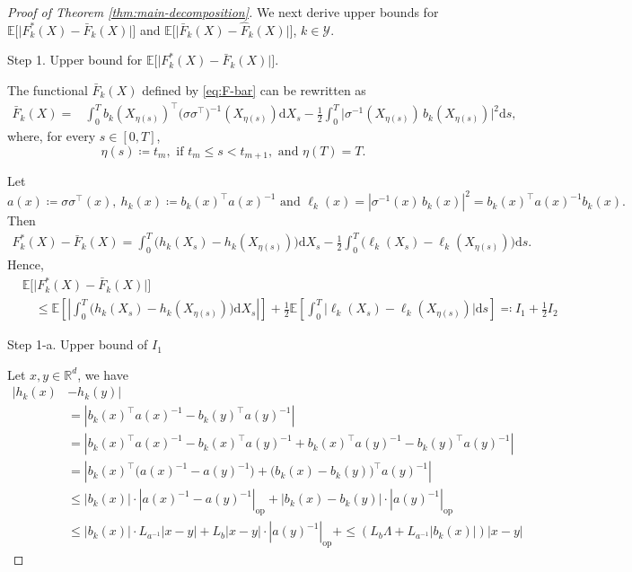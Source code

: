 \documentclass{article}
\theoremstyle{plain}
\theoremstyle{definition}
\theoremstyle{remark}
\renewcommand{\d}{\mathrm{d}}
\newcommand{\RD}{\mathbb{R}^{d}}
\newcommand{\EE}{\mathbb{E}}
\newcommand{\calY}{\mathcal{Y}}
\begin{document}
\begin{proof}[Proof of Theorem \ref{thm:main-decomposition}]
We next derive upper bounds for
$\EE \big[ \big|F_k^*(X)-\bar F_k(X) \big|\big]$ and $\EE \big[ \big|\bar F_k(X)-\widehat F_k(X) \big|\big]$, $k\in\calY$. 

{\sc Step 1. Upper bound for $\EE \big[ \big|F_k^*(X)-\bar F_k(X) \big|\big]$.}


The functional $\bar F_k(X)$ defined by \eqref{eq:F-bar} can be rewritten as 
\begin{align}\label{eq:F-bar-rewrite}
\bar{F}_k(X)
=& \int_{0}^{T}b_k(X_{\eta(s)})^{\top} \big(\sigma\sigma^{\top}\big)^{-1}(X_{\eta(s)})\d X_s - \frac{1}{2}\int_{0}^{T} \big\lvert \sigma^{-1} (X_{\eta(s)})\,b_k(X_{\eta(s)}) \big\rvert^2 \d s,
\end{align}
where, for every $s\in[0, T]$, 
\begin{equation}\label{eq:def-eta(s)}
    \eta (s)\coloneqq t_m, \text{ if } t_m\leq s < t_{m+1}, \text{ and }\eta(T)=T.
\end{equation}%

Let \[a(x)\coloneqq\sigma\sigma^{\top}(x), \:h_k(x)\coloneqq b_k(x)^{\top} a(x)^{-1}\text{ and }\ell_k(x)=|\sigma^{-1}(x)\,b_k(x)|^2=b_k(x)^{\top} a(x)^{-1} b_k(x).\] Then 
\begin{align}
F_k^*(X)-\bar F_k(X) = \int_0^T \big( h_k(X_s)-h_k(X_{\eta(s)})\big)\d X_s - \frac{1}{2}\int_0^T \big( \ell_k(X_s)-\ell_k(X_{\eta(s)})\big)\d s. 
\end{align}
Hence, 
\begin{align}
&\EE \big[ \big|F_k^*(X)-\bar F_k(X) \big|\big] \nonumber\\
&\quad\leq \EE \left[ \left|\int_0^T \big( h_k(X_s)-h_k(X_{\eta(s)})\big)\d X_s\right|\right]  + \frac{1}{2} \EE \left[\int_0^T \big| \ell_k(X_s)-\ell_k(X_{\eta(s)})\big|\d s\right]\eqqcolon I_1 + \frac{1}{2} I_2\nonumber
\end{align}

{\sc Step 1-a. Upper bound of $I_1$}

Let $x,y \in \RD$, we have 
\begin{align}\label{eq:lip-h}
    |h_k(x)&-h_k(y)|\nonumber\\
    &=|b_k(x)^{\top} a(x)^{-1}-b_k(y)^{\top} a(y)^{-1} |\nonumber\\
    &=|b_k(x)^{\top} a(x)^{-1}-b_k(x)^{\top} a(y)^{-1}+ b_k(x)^{\top} a(y)^{-1}-b_k(y)^{\top} a(y)^{-1}| \nonumber\\
    &=|b_k(x)^{\top} \big(a(x)^{-1}- a(y)^{-1}\big)+ \big(b_k(x)-b_k(y)\big)^{\top}a(y)^{-1} |\nonumber\\
    &\leq|b_k(x)|\cdot | a(x)^{-1}- a(y)^{-1} |_{\text{op}} + |b_k(x)-b_k(y)| \cdot | a(y)^{-1}|_{\text{op}} \nonumber\\
    &\leq |b_k(x)|\cdot L_{a^{-1}}|x-y| + L_b|x-y|\cdot |a(y)^{-1}|_{\text{op}} + 
    \leq (L_b\Lambda + L_{a^{-1}}|b_k(x)|)|x-y|
\end{align}



\end{proof}
\end{document}
